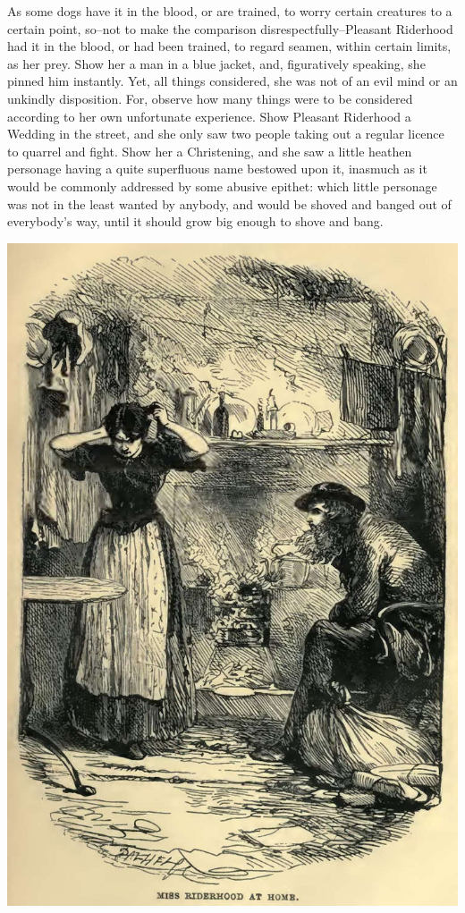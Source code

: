 As some dogs have it in the blood, or are trained, to worry certain
creatures to a certain point, so--not to make the comparison
disrespectfully--Pleasant Riderhood had it in the blood, or had been
trained, to regard seamen, within certain limits, as her prey. Show
her a man in a blue jacket, and, figuratively speaking, she pinned him
instantly. Yet, all things considered, she was not of an evil mind or an
unkindly disposition. For, observe how many things were to be considered
according to her own unfortunate experience. Show Pleasant Riderhood a
Wedding in the street, and she only saw two people taking out a regular
licence to quarrel and fight. Show her a Christening, and she saw a
little heathen personage having a quite superfluous name bestowed upon
it, inasmuch as it would be commonly addressed by some abusive epithet:
which little personage was not in the least wanted by anybody, and would
be shoved and banged out of everybody’s way, until it should grow
big enough to shove and bang. 

\includegraphics[scale=2.3]{02-12-01}

